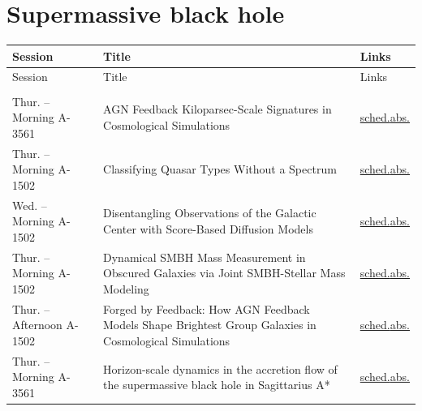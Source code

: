 \section*{Supermassive black hole}
{\small
\setlength{\emergencystretch}{1em}
\begin{longtable}{@{}>{\TableRaggedRight\arraybackslash\hspace{0pt}}p{} >{\TableRaggedRight\arraybackslash\hspace{0pt}}p{} >{\TableRaggedRight\arraybackslash\hspace{0pt}}p{}@{}}
\toprule
Session & Title & Links \\
\midrule
\endfirsthead
\toprule
Session & Title & Links \\
\midrule
\endhead
\addlinespace[0.15em]
\multicolumn{3}{@{}l}{\sffamily\bfseries\color{cascateal} Talks} \\
\addlinespace[0.1em]
Thur. -- Morning A-3561 & AGN Feedback Kiloparsec-Scale Signatures in Cosmological Simulations & \hyperlink{schedule-talk-18}{sched.}\newline \hyperlink{abstract-talk-18}{abs.} \\
Thur. -- Morning A-1502 & Classifying Quasar Types Without a Spectrum & \hyperlink{schedule-talk-193}{sched.}\newline \hyperlink{abstract-talk-193}{abs.} \\
Wed. -- Morning A-1502 & Disentangling Observations of the Galactic Center with Score-Based Diffusion Models & \hyperlink{schedule-talk-124}{sched.}\newline \hyperlink{abstract-talk-124}{abs.} \\
Thur. -- Morning A-1502 & Dynamical SMBH Mass Measurement in Obscured Galaxies via Joint SMBH-Stellar Mass Modeling & \hyperlink{schedule-talk-330}{sched.}\newline \hyperlink{abstract-talk-330}{abs.} \\
Thur. -- Afternoon A-1502 & Forged by Feedback: How AGN Feedback Models Shape Brightest Group Galaxies in Cosmological Simulations & \hyperlink{schedule-talk-29}{sched.}\newline \hyperlink{abstract-talk-29}{abs.} \\
Thur. -- Morning A-3561 & Horizon-scale dynamics in the accretion flow of the supermassive black hole in Sagittarius A* & \hyperlink{schedule-talk-19}{sched.}\newline \hyperlink{abstract-talk-19}{abs.} \\

\end{longtable}}
